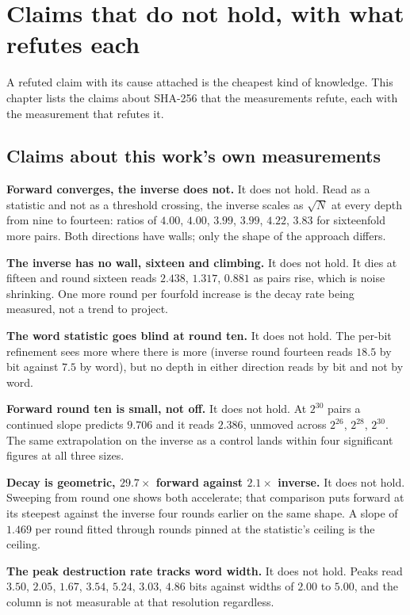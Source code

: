 \chapter{Claims that do not hold, with what refutes each}

A refuted claim with its cause attached is the cheapest kind of knowledge. This chapter lists the claims about SHA-256 that the measurements refute, each with the measurement that refutes it.

\section{Claims about this work's own measurements}

\textbf{Forward converges, the inverse does not.} It does not hold. Read as a statistic and not as a threshold crossing, the inverse scales as \(\sqrt{N}\) at every depth from nine to fourteen: ratios of \(4.00\), \(4.00\), \(3.99\), \(3.99\), \(4.22\), \(3.83\) for sixteenfold more pairs. Both directions have walls; only the shape of the approach differs.

\textbf{The inverse has no wall, sixteen and climbing.} It does not hold. It dies at fifteen and round sixteen reads \(2.438\), \(1.317\), \(0.881\) as pairs rise, which is noise shrinking. One more round per fourfold increase is the decay rate being measured, not a trend to project.

\textbf{The word statistic goes blind at round ten.} It does not hold. The per-bit refinement sees more where there is more (inverse round fourteen reads \(18.5\) by bit against \(7.5\) by word), but no depth in either direction reads by bit and not by word.

\textbf{Forward round ten is small, not off.} It does not hold. At \(2^{30}\) pairs a continued slope predicts \(9.706\) and it reads \(2.386\), unmoved across \(2^{26}\), \(2^{28}\), \(2^{30}\). The same extrapolation on the inverse as a control lands within four significant figures at all three sizes.

\textbf{Decay is geometric, \(29.7\times\) forward against \(2.1\times\) inverse.} It does not hold. Sweeping from round one shows both accelerate; that comparison puts forward at its steepest against the inverse four rounds earlier on the same shape. A slope of \(1.469\) per round fitted through rounds pinned at the statistic's ceiling is the ceiling.

\textbf{The peak destruction rate tracks word width.} It does not hold. Peaks read \(3.50\), \(2.05\), \(1.67\), \(3.54\), \(5.24\), \(3.03\), \(4.86\) bits against widths of \(2.00\) to \(5.00\), and the column is not measurable at that resolution regardless.

